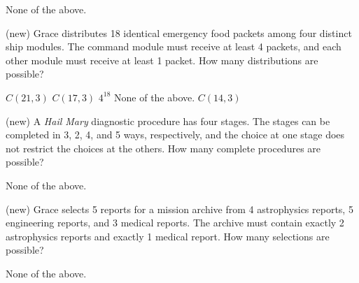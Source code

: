 \documentclass[11pt,addpoints]{exam}
\begin{document}
\begin{questions}
\begin{choices}
    \choice None of the above.
\end{choices}



\question[5] (new) Grace distributes 18 identical emergency food packets among four distinct ship modules. The command module must receive at least 4 packets, and each other module must receive at least 1 packet. How many distributions are possible?

\begin{choices}
    \choice $C(21,3)$
    \choice $C(17,3)$
    \choice $4^{18}$
    \choice None of the above.
    \choice $C(14,3)$
\end{choices}



\question[5] (new) A \textit{Hail Mary} diagnostic procedure has four stages. The stages can be completed in 3, 2, 4, and 5 ways, respectively, and the choice at one stage does not restrict the choices at the others. How many complete procedures are possible?

\begin{choices}
    \choice None of the above.
\end{choices}




\question[5] (new) Grace selects 5 reports for a mission archive from 4 astrophysics reports, 5 engineering reports, and 3 medical reports. The archive must contain exactly 2 astrophysics reports and exactly 1 medical report. How many selections are possible?

\begin{choices}
    \choice None of the above.
\end{choices}



\end{questions}
\end{document}
